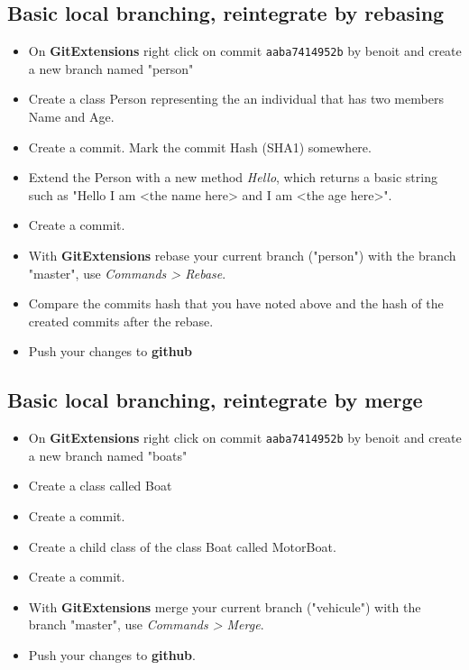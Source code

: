 \documentclass[11pt,amsfonts,amsmath]{article}
\begin{document}
\subsection{Basic local branching, reintegrate by rebasing}
\begin{itemize}
\item On \textbf{GitExtensions} right click on commit \texttt{aaba7414952b} by benoit and create a new branch named "person"
\item Create a class Person representing the an individual that has two members Name and Age.
\item Create a commit. Mark the commit Hash (SHA1) somewhere.
\item Extend the Person with a new method \emph{Hello}, which returns a basic string such as "Hello I am <the name here> and I am <the age here>".
\item Create a commit.
\item With \textbf{GitExtensions} rebase your current branch ("person") with the branch "master", use \emph{Commands > Rebase}.
\item Compare the commits hash that you have noted above and the hash of the created commits after the rebase.
\item Push your changes to \textbf{github}
\end{itemize}

\subsection{Basic local branching, reintegrate by merge}\label{sudentb:merge}
\begin{itemize}
\item On \textbf{GitExtensions} right click on commit \texttt{aaba7414952b} by benoit and create a new branch named "boats"
\item Create a class called Boat
\item Create a commit.
\item Create a child class of the class Boat called MotorBoat.
\item Create a commit.
\item With \textbf{GitExtensions} merge your current branch ("vehicule") with the branch "master", use \emph{Commands > Merge}.
\item Push your changes to \textbf{github}.
\end{itemize}
\end{document}
